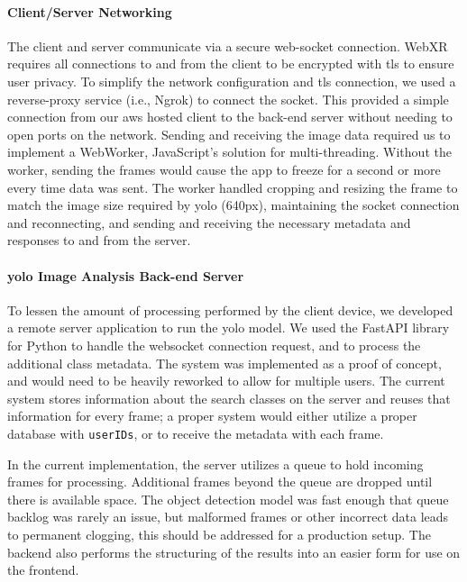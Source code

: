 \documentclass[thesis]{fputhesis}
\begin{document}
\begin{body}
\paragraph{Client/Server Networking}
The client and server communicate via a secure web-socket connection. WebXR requires all connections to and from the client to be encrypted with \acrshort{tls} to ensure user privacy. To simplify the network configuration and \acrshort{tls} connection, we used a reverse-proxy service (i.e., Ngrok) to connect the socket. This provided a simple connection from our \acrshort{aws} hosted client to the back-end server without needing to open ports on the network. 
Sending and receiving the image data required us to implement a WebWorker, JavaScript's solution for multi-threading. Without the worker, sending the frames would cause the app to freeze for a second or more every time data was sent. The worker handled cropping and resizing the frame to match the image size required by \acrshort{yolo} (640px), maintaining the socket connection and reconnecting, and sending and receiving the necessary metadata and responses to and from the server.

\paragraph{\acrshort{yolo} Image Analysis Back-end Server}
To lessen the amount of processing performed by the client device, we developed a remote server application to run the \acrshort{yolo} model. We used the FastAPI library for Python to handle the websocket connection request, and to process the additional class metadata. The system was implemented as a proof of concept, and would need to be heavily reworked to allow for multiple users. The current system stores information about the search classes on the server and reuses that information for every frame; a proper system would either utilize a proper database with \verb|userIDs|, or to receive the metadata with each frame. 

In the current implementation, the server utilizes a queue to hold incoming frames for processing. Additional frames beyond the queue are dropped until there is available space. The object detection model was fast enough that queue backlog was rarely an issue, but malformed frames or other incorrect data leads to permanent clogging, this should be addressed for a production setup. 
The backend also performs the structuring of the results into an easier form for use on the frontend. 


\end{body}
\end{document}
